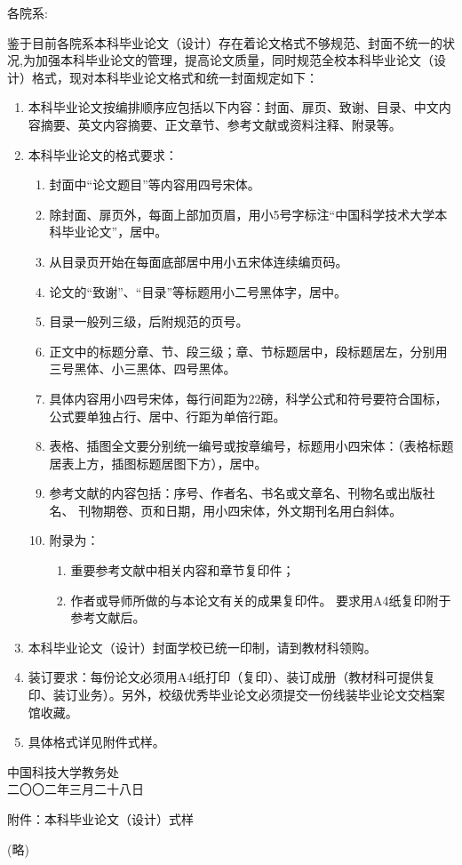 \bigskip

\noindent 各院系:

鉴于目前各院系本科毕业论文（设计）存在着论文格式不够规范、封面不统一的状况,为加强本科毕业论文的管理，提高论文质量，同时规范全校本科毕业论文（设计）格式，现对本科毕业论文格式和统一封面规定如下：
\begin{enumerate}
\item 本科毕业论文按编排顺序应包括以下内容：封面、扉页、致谢、目录、中文内容摘要、英文内容摘要、正文章节、参考文献或资料注释、附录等。
\item 本科毕业论文的格式要求：
\begin{enumerate}
\item 封面中“论文题目”等内容用四号宋体。
\item 除封面、扉页外，每面上部加页眉，用小5号字标注“中国科学技术大学本科毕业论文”，居中。
\item 从目录页开始在每面底部居中用小五宋体连续编页码。
\item 论文的“致谢”、“目录”等标题用小二号黑体字，居中。
\item 目录一般列三级，后附规范的页号。
\item 正文中的标题分章、节、段三级；章、节标题居中，段标题居左，分别用三号黑体、小三黑体、四号黑体。
\item 具体内容用小四号宋体，每行间距为22磅，科学公式和符号要符合国标，公式要单独占行、居中、行距为单倍行距。
\item 表格、插图全文要分别统一编号或按章编号，标题用小四宋体：（表格标题居表上方，插图标题居图下方），居中。
\item 参考文献的内容包括：序号、作者名、书名或文章名、刊物名或出版社名、
刊物期卷、页和日期，用小四宋体，外文期刊名用白斜体。
\item 附录为：
\begin{enumerate}
\item 重要参考文献中相关内容和章节复印件；
\item 作者或导师所做的与本论文有关的成果复印件。
要求用A4纸复印附于参考文献后。
\end{enumerate}
\end{enumerate}
\item 本科毕业论文（设计）封面学校已统一印制，请到教材科领购。
\item 装订要求：每份论文必须用A4纸打印（复印）、装订成册（教材科可提供复印、装订业务）。另外，校级优秀毕业论文必须提交一份线装毕业论文交档案馆收藏。
\item 具体格式详见附件式样。
\end{enumerate}

\begin{flushright}
中国科技大学教务处\\
二〇〇二年三月二十八日
\end{flushright}

附件：本科毕业论文（设计）式样

(略)
